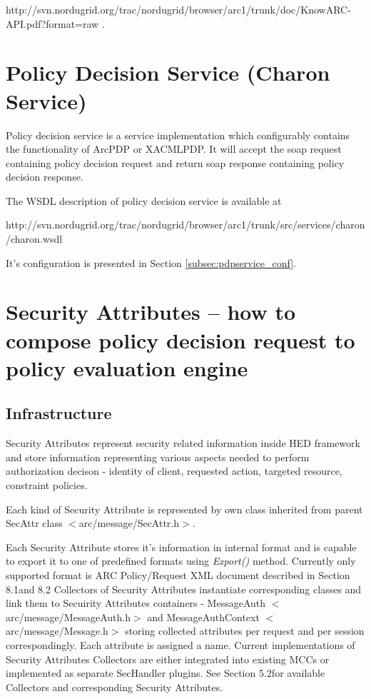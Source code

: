 \documentclass{article}                            %
\begin{document}
http://svn.nordugrid.org/trac/nordugrid/browser/arc1/trunk/doc/KnowARC-API.pdf?format=raw .



\section{Policy Decision Service (Charon Service)} %
\label{sec:policy_decision_service}
Policy decision service is a service implementation which configurably contains the functionality of ArcPDP or XACMLPDP. It will accept the soap request containing policy decision request and return soap response containing policy decision response.

The WSDL description of policy decision service is available at

 http://svn.nordugrid.org/trac/nordugrid/browser/arc1/trunk/src/services/charon/charon.wsdl

It's configuration is presented in Section \ref{subsec:pdpservice_conf}.



\section{Security Attributes -- how to compose policy decision request to policy evaluation engine} %
\label{sec:sec_attributes}

\subsection{Infrastructure} %
\label{subsec:sec_attr_infrastructure}

Security Attributes represent security related information inside HED framework and store information representing various aspects needed to perform authorization decison - identity of client, requested action, targeted resource, constraint policies.

Each kind of Security Attribute is represented by own class inherited from parent SecAttr class $<$arc/message/SecAttr.h$>$.

Each Security Attribute stores it's information in internal format and is capable to export it to one of predefined formats using \textit{Export()} method. Currently only supported format is ARC Policy/Request XML document described in Section 8.1and 8.2
Collectors of Security Attributes instantiate corresponding classes and link them to Secuirity Attributes containers - MessageAuth $<$arc/message/MessageAuth.h$>$ and MessageAuthContext $<$arc/message/Message.h$>$ storing collected attributes per request and per session correspondingly. Each attribute is assigned a name. Current implementations of Security Attributes Collectors are either integrated into existing MCCs or implemented as separate SecHandler plugins. See Section 5.2for available Collectors and corresponding Security Attributes.
\end{document}

